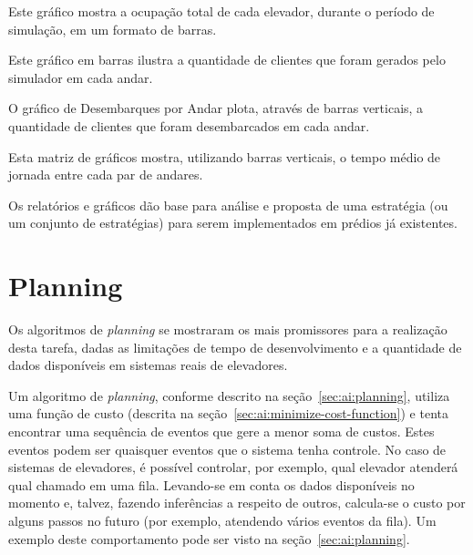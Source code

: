 \begin{description}[leftmargin=!,labelwidth=\widthof{\bfseries Tempo de Jornada por Andar}]
  \item[Clientes por Elevador]
    Este gráfico mostra a ocupação total de cada elevador, durante o período de
    simulação, em um formato de barras.
  \item[Chegadas por Andar]
    Este gráfico em barras ilustra a quantidade de clientes que foram gerados pelo
    simulador em cada andar.
  \item[Desembarques por Andar]
    O gráfico de Desembarques por Andar plota, através de barras verticais, a
    quantidade de clientes que foram desembarcados em cada andar.
  \item[Tempo de Jornada por Andar]
    Esta matriz de gráficos mostra, utilizando barras verticais, o tempo médio de
    jornada entre cada par de andares.
\end{description}

Os relatórios e gráficos dão base para análise e proposta de uma estratégia (ou
um conjunto de estratégias) para serem implementados em prédios já existentes.

\section{\label{sec:objectives:planning}Planning}


Os algoritmos de \textit{planning} se mostraram os mais promissores para a
realização desta tarefa, dadas as limitações de tempo de desenvolvimento e a
quantidade de dados disponíveis em sistemas reais de elevadores.

Um algoritmo de \textit{planning}, conforme descrito na
seção~\ref{sec:ai:planning}, utiliza uma função de custo (descrita na
seção~\ref{sec:ai:minimize-cost-function}) e tenta encontrar uma sequência de
eventos que gere a menor soma de custos. Estes eventos podem ser quaisquer
eventos que o sistema tenha controle. No caso de sistemas de elevadores, é
possível controlar, por exemplo, qual elevador atenderá qual chamado em uma
fila. Levando-se em conta os dados disponíveis no momento e, talvez, fazendo
inferências a respeito de outros, calcula-se o custo por alguns passos no futuro
(por exemplo, atendendo vários eventos da fila). Um exemplo deste comportamento
pode ser visto na seção~\ref{sec:ai:planning}.

